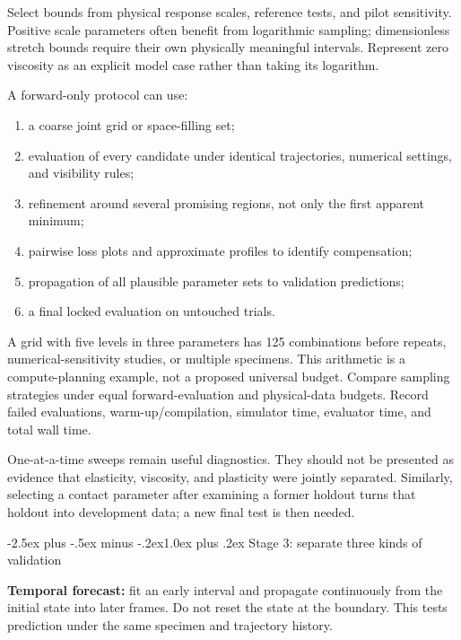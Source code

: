 \documentclass[
  11pt,
]{article}
\makeatletter
\providecommand{\tightlist}{%
  \setlength{\itemsep}{0pt}\setlength{\parskip}{0pt}}
\renewcommand\subsection{\needspace{5\baselineskip}\@startsection{subsection}{2}{\z@}%
  {-2.5ex plus -.5ex minus -.2ex}{1.0ex plus .2ex}%
  {\normalfont\sffamily\large\bfseries\color{accent}}}
\makeatother
\begin{document}
Select bounds from physical response scales, reference tests, and pilot
sensitivity. Positive scale parameters often benefit from logarithmic
sampling; dimensionless stretch bounds require their own physically
meaningful intervals. Represent zero viscosity as an explicit model case
rather than taking its logarithm.

A forward-only protocol can use:

\begin{enumerate}
\def\labelenumi{\arabic{enumi}.}
\tightlist
\item
  a coarse joint grid or space-filling set;
\item
  evaluation of every candidate under identical trajectories, numerical
  settings, and visibility rules;
\item
  refinement around several promising regions, not only the first
  apparent minimum;
\item
  pairwise loss plots and approximate profiles to identify compensation;
\item
  propagation of all plausible parameter sets to validation predictions;
\item
  a final locked evaluation on untouched trials.
\end{enumerate}

A grid with five levels in three parameters has 125 combinations before
repeats, numerical-sensitivity studies, or multiple specimens. This
arithmetic is a compute-planning example, not a proposed universal
budget. Compare sampling strategies under equal forward-evaluation and
physical-data budgets. Record failed evaluations, warm-up/compilation,
simulator time, evaluator time, and total wall time.

One-at-a-time sweeps remain useful diagnostics. They should not be
presented as evidence that elasticity, viscosity, and plasticity were
jointly separated. Similarly, selecting a contact parameter after
examining a former holdout turns that holdout into development data; a
new final test is then needed.

\subsection{Stage 3: separate three kinds of
validation}\label{stage-3-separate-three-kinds-of-validation}

\textbf{Temporal forecast:} fit an early interval and propagate
continuously from the initial state into later frames. Do not reset the
state at the boundary. This tests prediction under the same specimen and
trajectory history.
\end{document}
